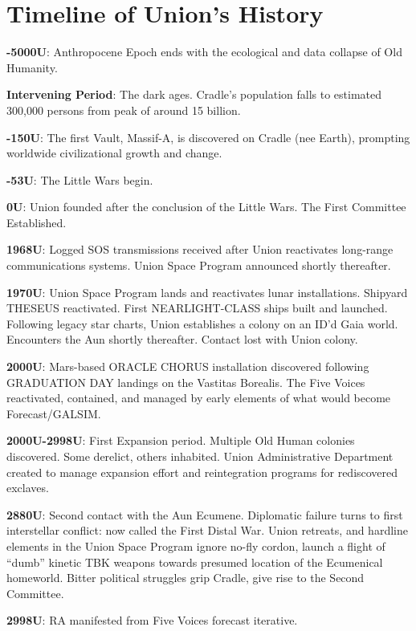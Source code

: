\section{Timeline of Union's History}

\textbf{-5000U}: Anthropocene Epoch ends with the ecological and data collapse of Old Humanity.

\textbf{Intervening Period}: The dark ages. Cradle’s population falls to estimated 300,000 persons from
peak of around 15 billion.

\textbf{-150U}: The first Vault, Massif-A, is discovered on Cradle (nee Earth), prompting worldwide
civilizational growth and change.

\textbf{-53U}: The Little Wars begin.

\textbf{0U}: Union founded after the conclusion of the Little Wars. The First Committee Established.

\textbf{1968U}: Logged SOS transmissions received after Union reactivates long-range communications
systems. Union Space Program announced shortly thereafter.

\textbf{1970U}: Union Space Program lands and reactivates lunar installations. Shipyard THESEUS
reactivated. First  NEARLIGHT-CLASS ships built and launched. Following legacy star charts,
Union establishes a colony on an ID’d Gaia world. Encounters the Aun shortly thereafter. Contact
lost with Union colony.

\textbf{2000U}: Mars-based ORACLE CHORUS installation discovered following GRADUATION DAY
landings on the Vastitas Borealis. The Five Voices reactivated, contained, and managed by early
elements of what would become Forecast/GALSIM.

\textbf{2000U-2998U}: First Expansion period. Multiple Old Human colonies discovered. Some derelict,
others inhabited. Union Administrative Department created to manage expansion effort and
reintegration programs for rediscovered exclaves.

\textbf{2880U}: Second contact with the Aun Ecumene. Diplomatic failure turns to first interstellar
conflict: now called the First Distal War. Union retreats, and hardline elements in the Union Space
Program ignore no-fly cordon, launch a flight of ``dumb'' kinetic TBK weapons towards presumed
location of the Ecumenical homeworld. Bitter political struggles grip Cradle, give rise to the
Second Committee.

\textbf{2998U}: RA manifested from Five Voices forecast iterative.

